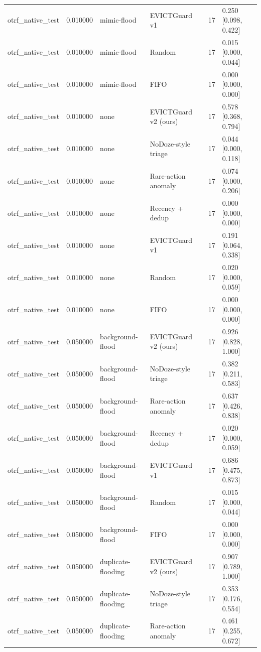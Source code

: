 \begin{tabular}{lrllrl}
otrf\_native\_test & 0.010000 & mimic-flood & EVICTGuard v1 & 17 & 0.250 [0.098, 0.422] \\
otrf\_native\_test & 0.010000 & mimic-flood & Random & 17 & 0.015 [0.000, 0.044] \\
otrf\_native\_test & 0.010000 & mimic-flood & FIFO & 17 & 0.000 [0.000, 0.000] \\
otrf\_native\_test & 0.010000 & none & EVICTGuard v2 (ours) & 17 & 0.578 [0.368, 0.794] \\
otrf\_native\_test & 0.010000 & none & NoDoze-style triage & 17 & 0.044 [0.000, 0.118] \\
otrf\_native\_test & 0.010000 & none & Rare-action anomaly & 17 & 0.074 [0.000, 0.206] \\
otrf\_native\_test & 0.010000 & none & Recency + dedup & 17 & 0.000 [0.000, 0.000] \\
otrf\_native\_test & 0.010000 & none & EVICTGuard v1 & 17 & 0.191 [0.064, 0.338] \\
otrf\_native\_test & 0.010000 & none & Random & 17 & 0.020 [0.000, 0.059] \\
otrf\_native\_test & 0.010000 & none & FIFO & 17 & 0.000 [0.000, 0.000] \\
otrf\_native\_test & 0.050000 & background-flood & EVICTGuard v2 (ours) & 17 & 0.926 [0.828, 1.000] \\
otrf\_native\_test & 0.050000 & background-flood & NoDoze-style triage & 17 & 0.382 [0.211, 0.583] \\
otrf\_native\_test & 0.050000 & background-flood & Rare-action anomaly & 17 & 0.637 [0.426, 0.838] \\
otrf\_native\_test & 0.050000 & background-flood & Recency + dedup & 17 & 0.020 [0.000, 0.059] \\
otrf\_native\_test & 0.050000 & background-flood & EVICTGuard v1 & 17 & 0.686 [0.475, 0.873] \\
otrf\_native\_test & 0.050000 & background-flood & Random & 17 & 0.015 [0.000, 0.044] \\
otrf\_native\_test & 0.050000 & background-flood & FIFO & 17 & 0.000 [0.000, 0.000] \\
otrf\_native\_test & 0.050000 & duplicate-flooding & EVICTGuard v2 (ours) & 17 & 0.907 [0.789, 1.000] \\
otrf\_native\_test & 0.050000 & duplicate-flooding & NoDoze-style triage & 17 & 0.353 [0.176, 0.554] \\
otrf\_native\_test & 0.050000 & duplicate-flooding & Rare-action anomaly & 17 & 0.461 [0.255, 0.672] \\

\end{tabular}

